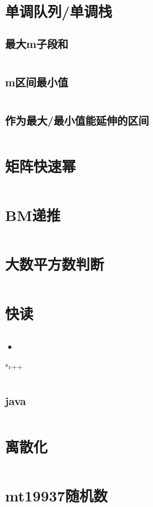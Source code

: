 \documentclass[a4paper,11pt]{article}
\begin{document}
\section*{单调队列/单调栈}
\subsection*{最大m子段和}
\inputminted[]{c++}{Template/Other/MonotonicQueueI.cpp}
\subsection*{m区间最小值}
\inputminted[]{c++}{Template/Other/MonotonicQueueII.cpp}
\subsection*{作为最大/最小值能延伸的区间}
\inputminted[]{c++}{Template/Other/MonotonicQueueIII.cpp}
\section*{矩阵快速幂}
\inputminted[]{c++}{Template/Other/FastMat.cpp}
\section*{BM递推}
\inputminted[]{c++}{Template/Other/BM.cpp}
\section*{大数平方数判断}
\inputminted[]{java}{Template/Other/IsSquare.java}
\section*{快读}
\subsection*{•}*{c++}
\inputminted[]{c++}{Template/Other/fread.cpp}
\subsection*{java}
\inputminted[]{java}{Template/Other/fScan.java}
\section*{离散化}
\inputminted[]{c++}{Template/Other/Discretization.cpp}
\section*{mt19937随机数}
\inputminted[]{c++}{Template/Other/mt19937.cpp}
\end{document}
